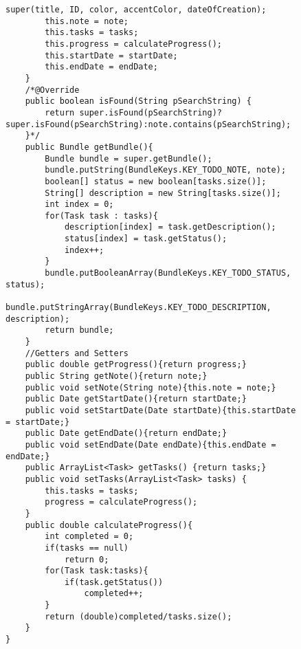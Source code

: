 \begin{figure}[H]
\begin{lstlisting}[caption=Todo (Joscha Nassenstein)]
        super(title, ID, color, accentColor, dateOfCreation);
        this.note = note;
        this.tasks = tasks;
        this.progress = calculateProgress();
        this.startDate = startDate;
        this.endDate = endDate;
    }
    /*@Override
    public boolean isFound(String pSearchString) {
        return super.isFound(pSearchString)?super.isFound(pSearchString):note.contains(pSearchString);
    }*/
    public Bundle getBundle(){
        Bundle bundle = super.getBundle();
        bundle.putString(BundleKeys.KEY_TODO_NOTE, note);
        boolean[] status = new boolean[tasks.size()];
        String[] description = new String[tasks.size()];
        int index = 0;
        for(Task task : tasks){
            description[index] = task.getDescription();
            status[index] = task.getStatus();
            index++;
        }
        bundle.putBooleanArray(BundleKeys.KEY_TODO_STATUS, status);
        bundle.putStringArray(BundleKeys.KEY_TODO_DESCRIPTION, description);
        return bundle;
    }
    //Getters and Setters
    public double getProgress(){return progress;}
    public String getNote(){return note;}
    public void setNote(String note){this.note = note;}
    public Date getStartDate(){return startDate;}
    public void setStartDate(Date startDate){this.startDate = startDate;}
    public Date getEndDate(){return endDate;}
    public void setEndDate(Date endDate){this.endDate = endDate;}
    public ArrayList<Task> getTasks() {return tasks;}
    public void setTasks(ArrayList<Task> tasks) {
        this.tasks = tasks;
        progress = calculateProgress();
    }
    public double calculateProgress(){
        int completed = 0;
        if(tasks == null)
            return 0;
        for(Task task:tasks){
            if(task.getStatus())
                completed++;
        }
        return (double)completed/tasks.size();
    }
}
\end{lstlisting}
\end{figure}

